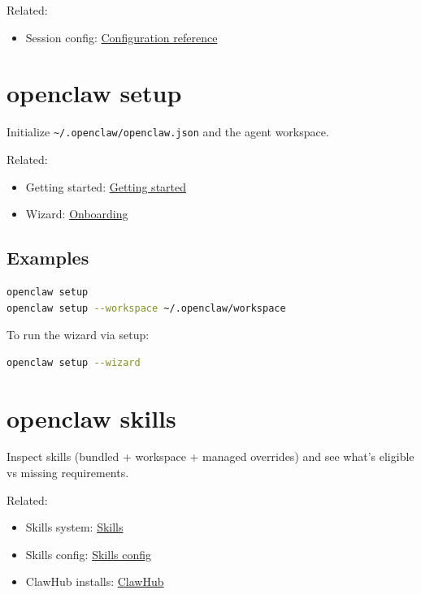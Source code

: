 Related:

\begin{itemize}
  \item Session config: \href{/gateway/configuration-reference\#session}{Configuration reference}
\end{itemize}



\clearpage

\section{openclaw setup}


Initialize \texttt{\textasciitilde{}/.openclaw/openclaw.json} and the agent workspace.

Related:

\begin{itemize}
  \item Getting started: \href{/start/getting-started}{Getting started}
  \item Wizard: \href{/start/onboarding}{Onboarding}
\end{itemize}


\subsection{Examples}


\begin{lstlisting}[language=bash]
openclaw setup
openclaw setup --workspace ~/.openclaw/workspace
\end{lstlisting}


To run the wizard via setup:

\begin{lstlisting}[language=bash]
openclaw setup --wizard
\end{lstlisting}



\clearpage

\section{openclaw skills}


Inspect skills (bundled + workspace + managed overrides) and see what’s eligible vs missing requirements.

Related:

\begin{itemize}
  \item Skills system: \href{/tools/skills}{Skills}
  \item Skills config: \href{/tools/skills-config}{Skills config}
  \item ClawHub installs: \href{/tools/clawhub}{ClawHub}
\end{itemize}



